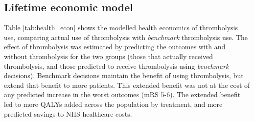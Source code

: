 \FloatBarrier

\subsection{Lifetime economic model}

Table \ref{tab:health_econ} shows the modelled health economics of thrombolysis use, comparing actual use of thrombolysis with \textit{benchmark} thrombolysis use. The effect of thrombolysis was estimated by predicting the outcomes with and without thrombolysis for the two groups (those that actually received thrombolysis, and those predicted to receive thrombolysis using \textit{benchmark} decisions). Benchmark decisions maintain the benefit of using thrombolysis, but extend that benefit to more patients. This extended benefit was not at the cost of any predicted increase in the worst outcomes (mRS 5-6). The extended benefit led to more QALYs added across the population by treatment, and more predicted savings to NHS healthcare costs.


